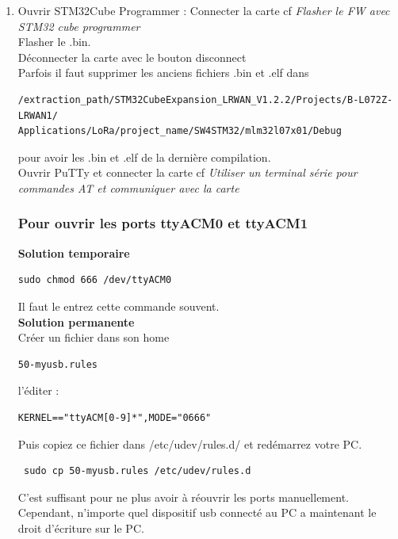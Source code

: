 \documentclass{article}
\begin{document}
\begin{itemize}
\begin{enumerate}
\item Ouvrir STM32Cube Programmer :
Connecter la carte cf \textit{Flasher le FW avec STM32 cube programmer} \\
Flasher le .bin. \\
Déconnecter la carte avec le bouton disconnect \\
Parfois il faut supprimer les anciens fichiers .bin et .elf dans

\begin{verbatim}
/extraction_path/STM32CubeExpansion_LRWAN_V1.2.2/Projects/B-L072Z-LRWAN1/
Applications/LoRa/project_name/SW4STM32/mlm32l07x01/Debug

\end{verbatim}

pour avoir les .bin et .elf de la dernière compilation. \\
Ouvrir PuTTy et connecter la carte cf  \textit{Utiliser  un  terminal  série  pour  commandes AT et communiquer avec la carte} \\


\subsubsection{Pour ouvrir les ports ttyACM0 et ttyACM1 }

\textbf{Solution temporaire} 


\begin{verbatim}
sudo chmod 666 /dev/ttyACM0
\end{verbatim}
Il faut le entrez cette commande souvent. \\
\textbf{Solution permanente}\\

Créer un fichier dans son home

\begin{verbatim}
50-myusb.rules
\end{verbatim} 

l'éditer : 

\begin{verbatim}
KERNEL=="ttyACM[0-9]*",MODE="0666"
\end{verbatim}

Puis copiez ce fichier dans /etc/udev/rules.d/ et redémarrez votre PC. \\

\begin{verbatim}
 sudo cp 50-myusb.rules /etc/udev/rules.d
\end{verbatim}
C'est suffisant pour ne plus avoir à réouvrir les ports manuellement. Cependant, n'importe quel dispositif usb connecté au PC a maintenant le droit d'écriture sur le PC. \\


\end{enumerate}
\end{itemize}
\end{document}

